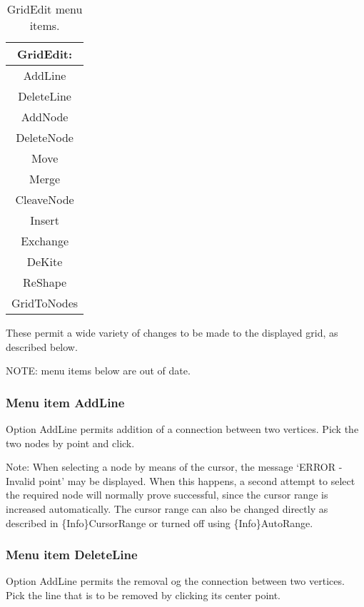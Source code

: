 \documentclass{article}
\begin{document}
\begin{table}[htb!]
 \caption{GridEdit menu items.}
  \begin{center}
   \begin{tabular}{|c|}
    \hline
GridEdit:\\     \hline
AddLine \\ DeleteLine \\ AddNode \\ DeleteNode \\ Move \\ Merge \\    \hline
CleaveNode \\ Insert \\ Exchange \\ DeKite \\ ReShape \\     \hline
GridToNodes \\
    \hline
   \end{tabular}
   \label{tab:GRIDEDIT}
  \end{center}
\end{table}

These permit a wide variety of changes to be made to the displayed grid, as described below.

NOTE: menu items below are out of date.





\subsubsection[Menu item AddLine]{Menu item AddLine}
Option AddLine permits addition of a connection between two vertices. Pick the two nodes by point and click.

Note: When selecting a node by means of the cursor, the message `ERROR - Invalid point' may be displayed. When this happens, a second attempt to select the required node will normally prove successful, since the cursor range is increased automatically. The cursor range can also be changed directly as described in \{Info\}CursorRange or turned off using \{Info\}AutoRange.

\subsubsection[Menu item DeleteLine]{Menu item DeleteLine}
Option AddLine permits the removal og the connection between two vertices. Pick the line that is to be removed by clicking its center point.
\end{document}
